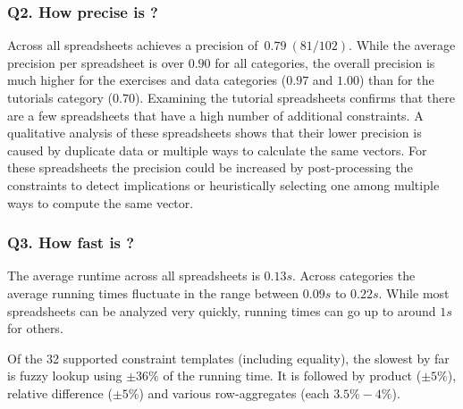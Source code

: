 \subsubsection*{Q2. How precise is \sname?}
Across all spreadsheets \sname achieves a precision of~$0.79~(81/102)$.
While the average precision per spreadsheet is over $0.90$ for all categories, the overall precision is much higher for the exercises and data categories ($0.97$ and $1.00$) than for the tutorials category ($0.70$).
Examining the tutorial spreadsheets confirms that there are a few spreadsheets that have a high number of additional constraints.
A qualitative analysis of these spreadsheets shows that their lower precision is caused by duplicate data or multiple ways to calculate the same vectors.
For these spreadsheets the precision could be increased by post-processing the constraints to detect implications or heuristically selecting one among multiple ways to compute the same vector.





\subsubsection*{Q3. How fast is \sname?}
The average runtime across all spreadsheets is $0.13s$.
Across categories the average running times fluctuate in the range between $0.09s$ to $0.22s$.
While most spreadsheets can be analyzed very quickly, running times can go up to around $1s$ for others.




Of the 32 supported constraint templates (including equality), the slowest by far is fuzzy lookup using $\pm 36\%$ of the running time.
It is followed by product ($\pm 5\%$), relative difference ($\pm 5\%$) and various row-aggregates (each $3.5\% - 4\%$).

